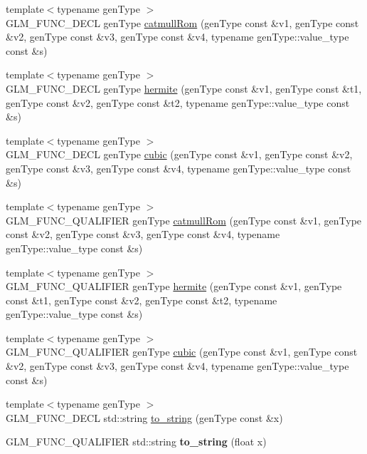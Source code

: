 \begin{DoxyCompactItemize}
\item 
{\footnotesize template$<$typename gen\+Type $>$ }\\G\+L\+M\+\_\+\+F\+U\+N\+C\+\_\+\+D\+E\+CL gen\+Type \hyperlink{group__gtx__spline_ga8119c04f8210fd0d292757565cd6918d}{catmull\+Rom} (gen\+Type const \&v1, gen\+Type const \&v2, gen\+Type const \&v3, gen\+Type const \&v4, typename gen\+Type\+::value\+\_\+type const \&s)
\item 
{\footnotesize template$<$typename gen\+Type $>$ }\\G\+L\+M\+\_\+\+F\+U\+N\+C\+\_\+\+D\+E\+CL gen\+Type \hyperlink{group__gtx__spline_gaa69e143f6374d32f934a8edeaa50bac9}{hermite} (gen\+Type const \&v1, gen\+Type const \&t1, gen\+Type const \&v2, gen\+Type const \&t2, typename gen\+Type\+::value\+\_\+type const \&s)
\item 
{\footnotesize template$<$typename gen\+Type $>$ }\\G\+L\+M\+\_\+\+F\+U\+N\+C\+\_\+\+D\+E\+CL gen\+Type \hyperlink{group__gtx__spline_ga6b867eb52e2fc933d2e0bf26aabc9a70}{cubic} (gen\+Type const \&v1, gen\+Type const \&v2, gen\+Type const \&v3, gen\+Type const \&v4, typename gen\+Type\+::value\+\_\+type const \&s)
\item 
{\footnotesize template$<$typename gen\+Type $>$ }\\G\+L\+M\+\_\+\+F\+U\+N\+C\+\_\+\+Q\+U\+A\+L\+I\+F\+I\+ER gen\+Type \hyperlink{group__gtx__spline_ga8119c04f8210fd0d292757565cd6918d}{catmull\+Rom} (gen\+Type const \&v1, gen\+Type const \&v2, gen\+Type const \&v3, gen\+Type const \&v4, typename gen\+Type\+::value\+\_\+type const \&s)
\item 
{\footnotesize template$<$typename gen\+Type $>$ }\\G\+L\+M\+\_\+\+F\+U\+N\+C\+\_\+\+Q\+U\+A\+L\+I\+F\+I\+ER gen\+Type \hyperlink{group__gtx__spline_gaa69e143f6374d32f934a8edeaa50bac9}{hermite} (gen\+Type const \&v1, gen\+Type const \&t1, gen\+Type const \&v2, gen\+Type const \&t2, typename gen\+Type\+::value\+\_\+type const \&s)
\item 
{\footnotesize template$<$typename gen\+Type $>$ }\\G\+L\+M\+\_\+\+F\+U\+N\+C\+\_\+\+Q\+U\+A\+L\+I\+F\+I\+ER gen\+Type \hyperlink{group__gtx__spline_ga6b867eb52e2fc933d2e0bf26aabc9a70}{cubic} (gen\+Type const \&v1, gen\+Type const \&v2, gen\+Type const \&v3, gen\+Type const \&v4, typename gen\+Type\+::value\+\_\+type const \&s)
\item 
{\footnotesize template$<$typename gen\+Type $>$ }\\G\+L\+M\+\_\+\+F\+U\+N\+C\+\_\+\+D\+E\+CL std\+::string \hyperlink{group__gtx__string__cast_ga8f0dced1fd45e67e2d77e80ab93c7af5}{to\+\_\+string} (gen\+Type const \&x)
\item 
G\+L\+M\+\_\+\+F\+U\+N\+C\+\_\+\+Q\+U\+A\+L\+I\+F\+I\+ER std\+::string {\bfseries to\+\_\+string} (float x)\hypertarget{namespaceglm_a7ce206c00733fcd6f17f2923de5009ae}{}\label{namespaceglm_a7ce206c00733fcd6f17f2923de5009ae}


\end{DoxyCompactItemize}
